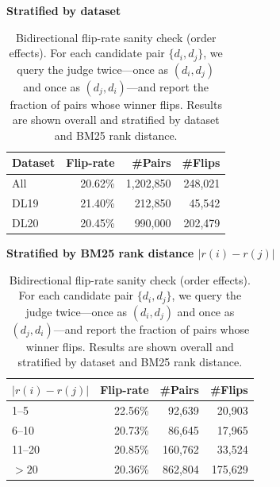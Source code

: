 \documentclass[11pt]{article}
\begin{document}
\begin{table}[H]
\centering
\small
\renewcommand{\arraystretch}{1.15}
\setlength{\tabcolsep}{6pt}

\begin{minipage}[t]{0.48\textwidth}
\centering
\textbf{Stratified by dataset}\\[2pt]
\begin{tabular}{lrrr}
\hline
Dataset & Flip-rate & \#Pairs & \#Flips \\
\hline
All   & 20.62\% & 1,202,850 & 248,021 \\
DL19  & 21.40\% &   212,850 &  45,542 \\
DL20  & 20.45\% &   990,000 & 202,479 \\
\hline
\end{tabular}
\end{minipage}\hfill
\begin{minipage}[t]{0.48\textwidth}
\centering
\textbf{Stratified by BM25 rank distance $|r(i)-r(j)|$}\\[2pt]
\begin{tabular}{lrrr}
\hline
$|r(i)-r(j)|$ & Flip-rate & \#Pairs & \#Flips \\
\hline
1--5    & 22.56\% &  92,639 &  20,903 \\
6--10   & 20.73\% &  86,645 &  17,965 \\
11--20  & 20.85\% & 160,762 &  33,524 \\
$>20$   & 20.36\% & 862,804 & 175,629 \\
\hline
\end{tabular}
\end{minipage}

\caption{Bidirectional flip-rate sanity check (order effects). For each candidate pair $\{d_i,d_j\}$, we query the judge twice—once as $(d_i,d_j)$ and once as $(d_j,d_i)$—and report the fraction of pairs whose winner flips. Results are shown overall and stratified by dataset and BM25 rank distance.}
\label{tab:flip_rate_order_effects}
\end{table}
\end{document}
